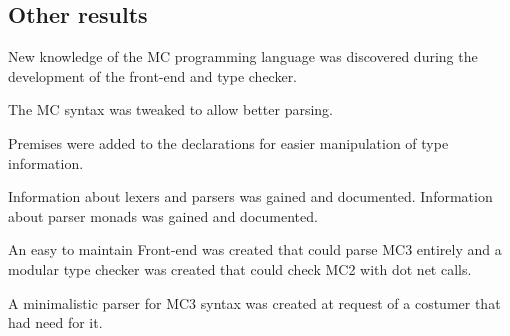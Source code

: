 \subsection{Other results}
New knowledge of the MC programming language was discovered during the development of the front-end and type checker. 

The MC syntax was tweaked to allow better parsing.

Premises were added to the declarations for easier manipulation of type information.

Information about lexers and parsers was gained and documented.
Information about parser monads was gained and documented.

An easy to maintain Front-end was created that could parse MC3 entirely and a modular type checker was created that could check MC2 with dot net calls.

A minimalistic parser for MC3 syntax was created at request of a costumer that had need for it.  